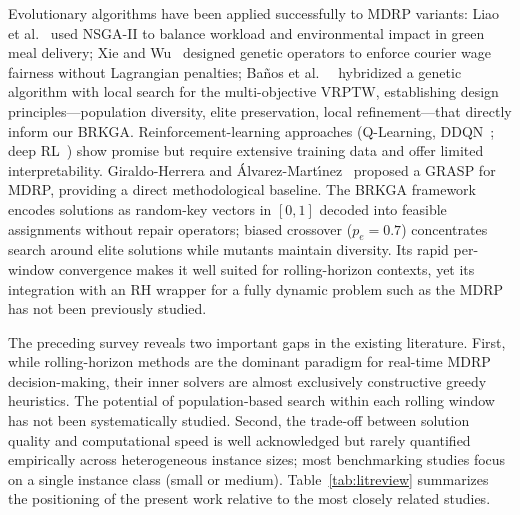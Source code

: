 \documentclass[runningheads]{llncs}
\begin{document}
Evolutionary algorithms have been applied successfully to MDRP
variants: Liao et al.~\cite{ref-liao2020} used NSGA-II to
balance workload and environmental impact in green meal delivery;
Xie and Wu~\cite{ref-xie2024} designed genetic operators to
enforce courier wage fairness without Lagrangian penalties;
Ba\~{n}os et al.~~\cite{ref-banos2013} hybridized a genetic
algorithm with local search for the multi-objective VRPTW,
establishing design principles—population diversity, elite
preservation, local refinement—that directly inform our BRKGA.
Reinforcement-learning approaches (Q-Learning,
DDQN~\cite{ref-bozanta2022}; deep RL~\cite{ref-ahamed2020}) show promise but require extensive training data and offer limited interpretability. Giraldo-Herrera and \'Alvarez-Mart\'{\i}nez~\cite{ref-giraldo2024} proposed a GRASP for MDRP, providing a direct methodological baseline.
The BRKGA framework~\cite{ref-goncalves2011,ref-londe2025}
encodes solutions as random-key vectors in $[0,1]$ decoded into
feasible assignments without repair operators; biased crossover
($p_e=0.7$) concentrates search around elite solutions while
mutants maintain diversity. Its rapid per-window convergence makes it well suited for rolling-horizon contexts, yet its integration with an RH wrapper for a fully dynamic problem such as the MDRP has not been previously studied.


The preceding survey reveals two important gaps in the existing literature.
First, while rolling-horizon methods are the dominant paradigm for real-time MDRP decision-making, their inner solvers are almost exclusively constructive greedy heuristics. The potential of population-based search within each rolling
window has not been systematically studied. Second, the trade-off between solution quality and computational speed is well acknowledged but rarely quantified empirically across heterogeneous instance sizes; most benchmarking studies
focus on a single instance class (small or medium). Table~\ref{tab:litreview} summarizes the positioning of the present work relative to the most closely related studies.
\end{document}
